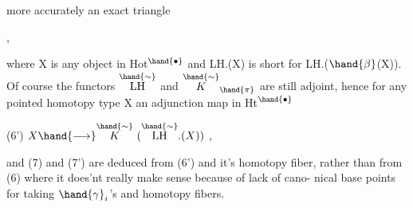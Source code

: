 more accurately an exact triangle

   \qquad ,

where X is any object in Hot$^\hand{\bullet}$ and LH.(X) is short for LH.($\hand{\beta}$(X)). Of
course the functors $\overset{\hand{\sim}}{\mathrm{LH}}$ and $\overset{\hand{\sim}}{K}_{\hand{\pi}}$ are still adjoint, hence for any pointed
homotopy type X an adjunction map in Ht$^\hand{\bullet}$

(6') \qquad $X \hand{\longrightarrow} \overset{\hand{\sim}}{K}\ (\overset{\hand{\sim}}{\mathrm{LH}}.(X))$ \quad ,

and (7) and (7') are deduced from (6') and it's homotopy fiber, rather
than from (6) where it does'nt really make sense because of lack of cano-%
nical base points for taking $\hand{\gamma}_i$'s and homotopy fibers.


